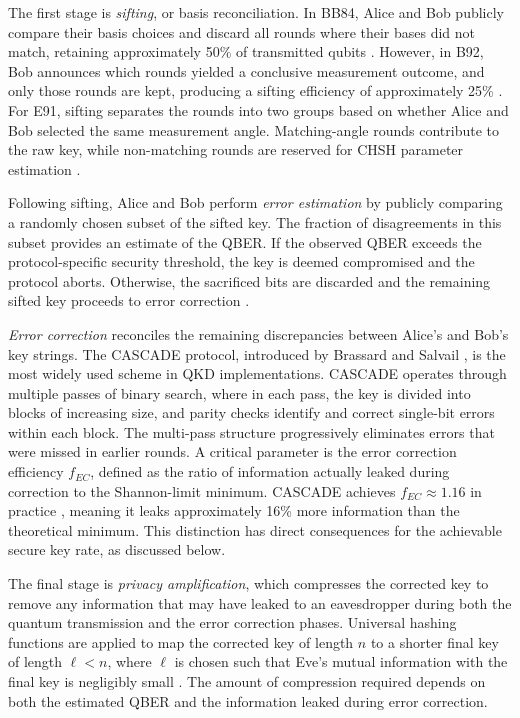 The first stage is \textit{sifting}, or basis reconciliation. In BB84, Alice and Bob publicly compare their basis choices and discard all rounds where their bases did not match, retaining approximately 50\% of transmitted qubits \cite{BB84}. However, in B92, Bob announces which rounds yielded a conclusive measurement outcome, and only those rounds are kept, producing a sifting efficiency of approximately 25\% \cite{B92}. For E91, sifting separates the rounds into two groups based on whether Alice and Bob selected the same measurement angle. Matching-angle rounds contribute to the raw key, while non-matching rounds are reserved for CHSH parameter estimation \cite{E91}.

Following sifting, Alice and Bob perform \textit{error estimation} by publicly comparing a randomly chosen subset of the sifted key. The fraction of disagreements in this subset provides an estimate of the QBER. If the observed QBER exceeds the protocol-specific security threshold, the key is deemed compromised and the protocol aborts. Otherwise, the sacrificed bits are discarded and the remaining sifted key proceeds to error correction \cite{Scarani2009}.

\textit{Error correction} reconciles the remaining discrepancies between Alice's and Bob's key strings. The CASCADE protocol, introduced by Brassard and Salvail \cite{Cascade1994}, is the most widely used scheme in QKD implementations. CASCADE operates through multiple passes of binary search, where in each pass, the key is divided into blocks of increasing size, and parity checks identify and correct single-bit errors within each block. The multi-pass structure progressively eliminates errors that were missed in earlier rounds. A critical parameter is the error correction efficiency $f_{EC}$, defined as the ratio of information actually leaked during correction to the Shannon-limit minimum. CASCADE achieves $f_{EC} \approx 1.16$ in practice \cite{Cascade1994}, meaning it leaks approximately 16\% more information than the theoretical minimum. This distinction has direct consequences for the achievable secure key rate, as discussed below.

The final stage is \textit{privacy amplification}, which compresses the corrected key to remove any information that may have leaked to an eavesdropper during both the quantum transmission and the error correction phases. Universal hashing functions are applied to map the corrected key of length $n$ to a shorter final key of length $\ell < n$, where $\ell$ is chosen such that Eve's mutual information with the final key is negligibly small \cite{Bennett1995PA}. The amount of compression required depends on both the estimated QBER and the information leaked during error correction.


